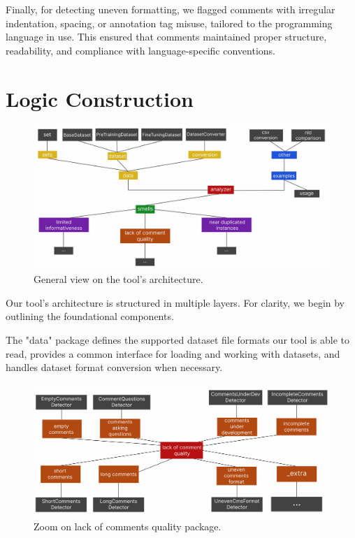 \noindent Finally, for detecting uneven formatting, we flagged comments with irregular indentation, spacing, or annotation tag misuse, tailored to the programming language in use. This ensured that comments maintained proper structure, readability, and compliance with language-specific conventions.

\section{Logic Construction}\label{sec:logic-construction}

\begin{figure}[ht]
	\centering\includegraphics[width=450pt]{figs/architecture-v4.PNG}
	\captionsetup{justification=centering}
	\caption{General view on the tool's architecture.}
	\label{fig:whole-architecture}
\end{figure}

\noindent Our tool's architecture is structured in multiple layers. For clarity, we begin by outlining the foundational components.

\noindent The "data" package defines the supported dataset file formats our tool is able to read, provides a common interface for loading and working with datasets, and handles dataset format conversion when necessary.
	
\begin{figure}[ht]
	\centering\includegraphics[width=450pt]{figs/cmsquality-v2.PNG}
	\captionsetup{justification=centering}
	\caption{Zoom on lack of comments quality package.}
	\label{fig:zoom-cmsquality}
\end{figure}
	
